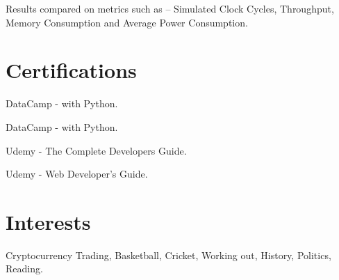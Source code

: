 \documentclass[]{vansh-resume}
\begin{document}
\begin{minipage}[t]{0.64\textwidth}
\smallskip
\begin{tightemize}
\item {}
\end{tightemize}
\sectionsep

\smallskip
\begin{tightemize}
\item Results compared on metrics such as – Simulated Clock Cycles, Throughput, Memory Consumption and Average Power Consumption.
\item {}
\end{tightemize}
\sectionsep


\section{Certifications}
\medskip
\begin{tightemize}
\item DataCamp - \href{https://www.datacamp.com/statement-of-accomplishment/track/18edab84e8804850e65a90a1caf050071bdf14cd}{} with Python.	
\end{tightemize}
\begin{tightemize}
\item DataCamp - \href{https://www.datacamp.com/statement-of-accomplishment/track/95f7129f30a36a11b3c1e91796e10069fa2205a4}{}  with Python.	
\end{tightemize}
\begin{tightemize}
\item Udemy - \href{https://www.udemy.com/certificate/UC-V5V2TIG4/}{}  The Complete Developers Guide. 	
\end{tightemize}
\begin{tightemize}
\item Udemy -  \href{https://www.udemy.com/certificate/UC-5ZX7ROX0/}{} Web Developer’s Guide.	
\end{tightemize}
\sectionsep


\section{Interests}
\medskip
\begin{tightemize}
\item Cryptocurrency Trading, Basketball, Cricket, Working out, History, Politics, Reading. 
\end{tightemize}
\sectionsep
\end{minipage} 
\end{document}
